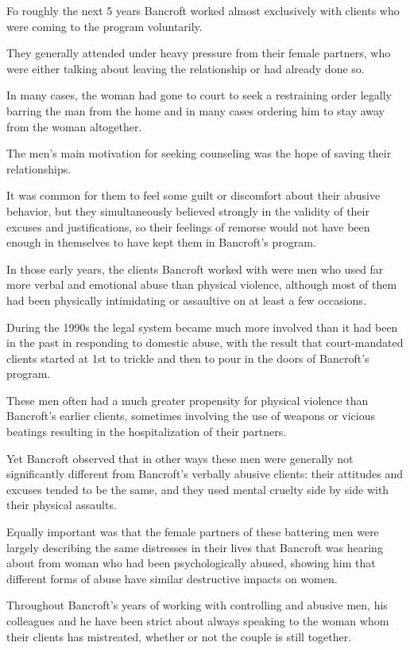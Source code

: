 \documentclass[oneside]{article}
\numberwithin{equation}{section}
\begin{document}
Fo roughly the next 5 years Bancroft worked almost exclusively with clients who were coming to the program voluntarily.

They generally attended under heavy pressure from their female partners, who were either talking about leaving the relationship or had already done so.

In many cases, the woman had gone to court to seek a restraining order legally barring the man from the home and in many cases ordering him to stay away from the woman altogether.

The men's main motivation for seeking counseling was the hope of saving their relationships.

It was common for them to feel some guilt or discomfort about their abusive behavior, but they simultaneously believed strongly in the validity of their excuses and justifications, so their feelings of remorse would not have been enough in themselves to have kept them in Bancroft's program.

In those early years, the clients Bancroft worked with were men who used far more verbal and emotional abuse than physical violence, although most of them had been physically intimidating or assaultive on at least a few occasions.

%
During the 1990s the legal system became much more involved than it had been in the past in responding to domestic abuse, with the result that court-mandated clients started at 1st to trickle and then to pour in the doors of Bancroft's program.

These men often had a much greater propensity for physical violence than Bancroft's earlier clients, sometimes involving the use of weapons or vicious beatings resulting in the hospitalization of their partners.

Yet Bancroft observed that in other ways these men were generally not significantly different from Bancroft's verbally abusive clients: their attitudes and excuses tended to be the same, and they used mental cruelty side by side with their physical assaults.

Equally important was that the female partners of these battering men were largely describing the same distresses in their lives that Bancroft was hearing about from woman who had been psychologically abused, showing him that different forms of abuse have similar destructive impacts on women.

%
Throughout Bancroft's years of working with controlling and abusive men, his colleagues and he have been strict about always speaking to the woman whom their clients has mistreated, whether or not the couple is still together.
\end{document}
